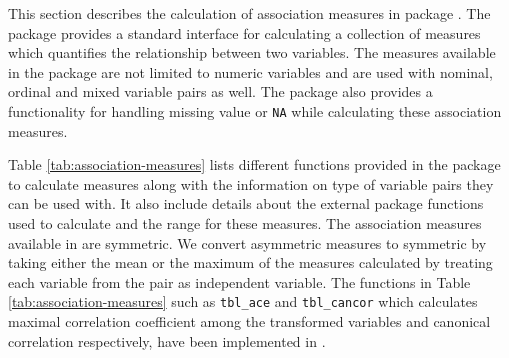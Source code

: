 This section describes the calculation of association measures in
package . The package provides a standard interface for
calculating a collection of measures which quantifies the relationship
between two variables. The measures available in the package are not
limited to numeric variables and are used with nominal, ordinal and
mixed variable pairs as well. The package also provides a functionality
for handling missing value or \texttt{NA} while calculating these
association measures.

Table \ref{tab:association-measures} lists different functions provided
in the package to calculate measures along with the information on type
of variable pairs they can be used with. It also include details about
the external package functions used to calculate and the range for these
measures. The association measures available in  are
symmetric. We convert asymmetric measures to symmetric by taking either
the mean or the maximum of the measures calculated by treating each
variable from the pair as independent variable. The functions in Table
\ref{tab:association-measures} such as \texttt{tbl\_ace} and
\texttt{tbl\_cancor} which calculates maximal correlation coefficient
among the transformed variables and canonical correlation respectively,
have been implemented in .

\begin{Schunk}
\begin{table}

\caption{\label{tab:association-measures}List of the functions available in the package for calculating different association measures along with the packages used for calculation.}
\centering
{}
\end{table}

\end{Schunk}

